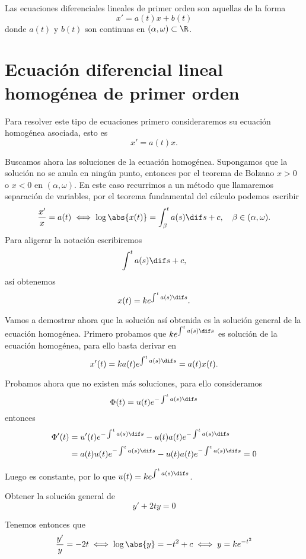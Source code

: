 \documentclass[../main.tex]{subfiles}
\begin{document}
\begin{definition}
Las ecuaciones diferenciales lineales de primer orden son aquellas de la forma
\[x' = a(t)x + b(t)\]
donde \(a(t)\) y \(b(t)\) son continuas en \((\alpha, \omega) \subset \R\).
\end{definition}

\section{Ecuación diferencial lineal homogénea de primer orden}

Para resolver este tipo de ecuaciones primero consideraremos su ecuación
homogénea asociada, esto es
\[x' = a(t)x.\]

Buscamos ahora las soluciones de la ecuación homogénea. Supongamos que la
solución no se anula en ningún punto, entonces por el teorema de Bolzano
\(x > 0\) o \(x < 0\) en \((\alpha, \omega)\). En este caso recurrimos a un
método que llamaremos separación de variables, por el teorema fundamental del
cálculo podemos escribir
\[\frac{x'}{x} = a(t) \iff \log\abs{x(t)} = \int_{\beta}^t a(s) \dif s + c,
	\quad \beta \in (\alpha, \omega).\]
Para aligerar la notación escribiremos
\[\int^t a(s) \dif s + c,\]
así obtenemos
\[x(t) = k e^{\int^t a(s) \dif s}.\]

Vamos a demostrar ahora que la solución así obtenida es la solución general de 
la ecuación homogénea. Primero probamos que \(k e^{\int^t a(s) \dif s}\) es
solución de la ecuación homogénea, para ello basta derivar en
\[x'(t) = k a(t) e^{\int^t a(s) \dif s} = a(t) x(t).\]

Probamos ahora que no existen más soluciones, para ello consideramos 
\[\Phi(t) = u(t) e^{-\int^t a(s) \dif s}\]
entonces
\begin{align*}
	\Phi'(t) &= u'(t) e^{-\int^t a(s) \dif s} 
		- u(t) a(t) e^{-\int^t a(s) \dif s} \\
		&= a(t) u(t) e^{-\int^t a(s) \dif s} - u(t) a(t) e^{-\int^t a(s) \dif s}
		= 0
\end{align*}

Luego es constante, por lo que \(u(t) = k e^{\int^t a(s) \dif s}\).

\begin{example}
	Obtener la solución general de
	\[y' + 2ty = 0\]
\end{example}

\begin{solution}
	Tenemos entonces que
	\[\frac{y'}{y} = -2t \iff \log\abs{y} = -t^2 + c \iff y = k e^{-t^2}\]
\end{solution}
\end{document}
